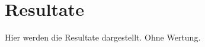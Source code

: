 %
%
%
%

\chapter{Resultate}
\label{chap:Resultate}


Hier werden die Resultate dargestellt. Ohne Wertung.

%

